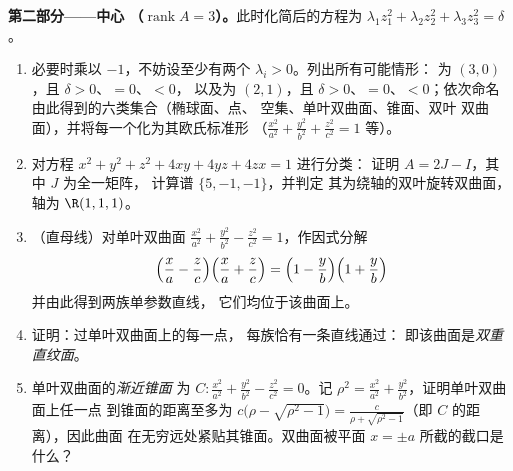 \begin{problem}
\medskip
\noindent\textbf{第二部分——中心
（$\operatorname{rank}A = 3$）。}此时化简后的方程为
$\lambda_1z_1^2 + \lambda_2z_2^2 + \lambda_3z_3^2 = \delta$。
\begin{enumerate}[resume]
  \item 必要时乘以 $-1$，不妨设至少有两个
        $\lambda_i > 0$。列出所有可能情形：
        为 $(3, 0)$，且 $\delta > 0$、$= 0$、$< 0$，
        以及为 $(2, 1)$，且 $\delta > 0$、$= 0$、$<
        0$；依次命名由此得到的六类集合（椭球面、点、
        空集、单叶双曲面、锥面、双叶
        双曲面），并将每一个化为其欧氏标准形
        （$\frac{x^2}{a^2} + \frac{y^2}{b^2} +
        \frac{z^2}{c^2} = 1$ 等）。
  \item 对方程 $x^2 + y^2 + z^2 + 4xy + 4yz + 4zx = 1$ 进行分类：
        证明 $A = 2J - I$，其中 $J$ 为全一矩阵，
        计算谱 $\{5, -1, -1\}$，并判定
        其为绕轴的双叶旋转双曲面，轴为
        $\R(1,1,1)$。
  \item （直母线）对单叶双曲面
        $\frac{x^2}{a^2} + \frac{y^2}{b^2} - \frac{z^2}{c^2}
        = 1$，作因式分解
        \[
        \Bigl(\frac xa - \frac zc\Bigr)
        \Bigl(\frac xa + \frac zc\Bigr)
        = \Bigl(1 - \frac yb\Bigr)\Bigl(1 + \frac yb\Bigr)
        \]
        并由此得到两族单参数直线，
        它们均位于该曲面上。
  \item 证明：过单叶双曲面上的每一点，
        每族恰有一条直线通过：
        即该曲面是\emph{双重直纹面}。
  \item 单叶双曲面的\emph{渐近锥面}
        为 $C : \frac{x^2}{a^2} + \frac{y^2}{b^2}
        - \frac{z^2}{c^2} = 0$。记 $\rho^2 = \frac{x^2}{a^2}
        + \frac{y^2}{b^2}$，证明单叶双曲面上任一点
        到锥面的距离至多为 $c\bigl(\rho -
        \sqrt{\rho^2 - 1}\bigr) = \frac{c}{\rho +
        \sqrt{\rho^2 - 1}}$（即 $C$ 的距离），因此曲面
        在无穷远处紧贴其锥面。双曲面被平面
        $x = \pm a$ 所截的截口是什么？
\end{enumerate}


\end{problem}
